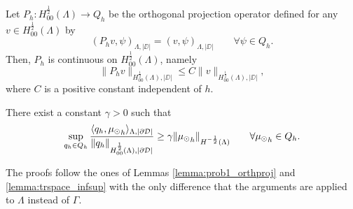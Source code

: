 \begin{lemma}\label{lemma:prob2_orthproj}
Let $P_h: H^{\frac 12}_{00}(\Lambda) \longrightarrow Q_h$ be the orthogonal projection operator defined  for any $v \in H^{\frac 12}_{00}(\Lambda)$ by
\begin{equation*}
(P_h v , \psi)_{\Lambda,|\DD|}= (v, \psi)_{\Lambda , |\DD|} \qquad \forall \psi \in Q_h.  
\end{equation*} 
Then, $P_h$ is continuous on $H^{\frac 12}_{00}(\Lambda)$, namely
\begin{equation*}
\|P_h v\|_{H^{\frac 12}_{00}(\Lambda),|\DD|} \leq C \|v\|_{H^{\frac 12}_{00}(\Lambda),|\DD|},
\end{equation*}
where $C$ is a positive constant independent of $h$.
\end{lemma}

\begin{lemma}\label{infsup_avr_trspace}
There exist a constant $\gamma >0$ such that
\begin{equation*}
\sup_{\substack{q_h \in Q_h}} \frac{\langle q_h , {\mu_{\odot}}_h \rangle_{\Lambda, |\partial\mathcal{D}|}}{ \|q_h\|_{H^{\frac 12}_{00}(\Lambda),|\partial\mathcal{D}|}} \geq \gamma \|{\mu_{\odot}}_h\|_{H^{-\frac 12}(\Lambda)} \qquad \forall {\mu_{\odot}}_h \in Q_h.
\end{equation*} 
\end{lemma}

The proofs follow the ones of Lemmas \ref{lemma:prob1_orthproj} and \ref{lemma:trspace_infsup} with the only difference that the arguments are applied to $\Lambda$ instead of $\Gamma$.

